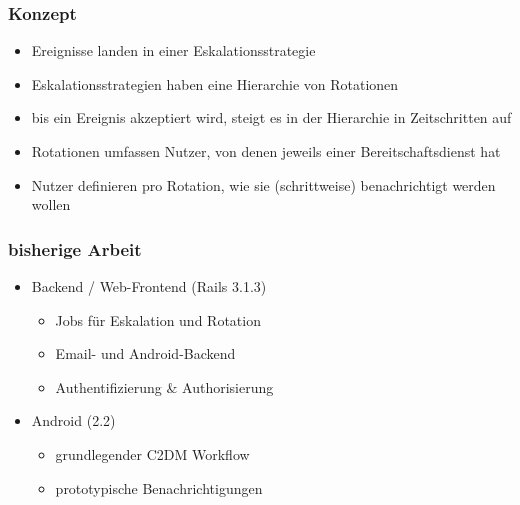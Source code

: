 \documentclass[slidestop,compress,red]{beamer}
\begin{document}
\begin{frame}[c,plain]
  \frametitle{Konzept}
  \begin{itemize}
    \item Ereignisse landen in einer Eskalationsstrategie
    \item Eskalationsstrategien haben eine Hierarchie von Rotationen
    \item bis ein Ereignis akzeptiert wird, steigt es in der Hierarchie in Zeitschritten auf
    \item Rotationen umfassen Nutzer, von denen jeweils einer Bereitschaftsdienst hat
    \item Nutzer definieren pro Rotation, wie sie (schrittweise) benachrichtigt werden wollen
  \end{itemize}
\end{frame}

\begin{frame}[c,plain]
  \frametitle{bisherige Arbeit}
  \begin{itemize}
    \item Backend / Web-Frontend (Rails 3.1.3)
    \begin{itemize}
      \item Jobs für Eskalation und Rotation
      \item Email- und Android-Backend
      \item Authentifizierung \& Authorisierung
    \end{itemize}
    \item Android (2.2)
    \begin{itemize}
      \item grundlegender C2DM Workflow
      \item prototypische Benachrichtigungen
    \end{itemize}
  \end{itemize}
\end{frame}
\end{document}
